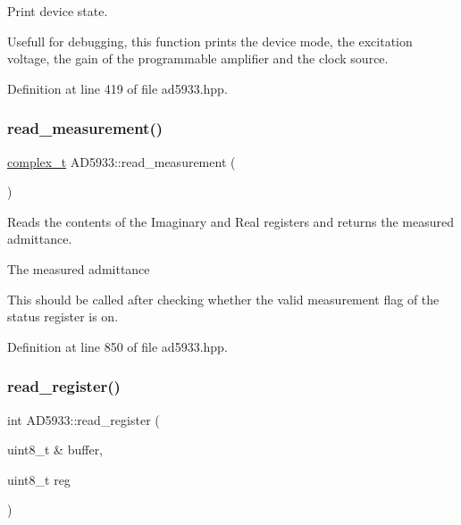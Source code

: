 Print device state. 

Usefull for debugging, this function prints the device mode, the excitation voltage, the gain of the programmable amplifier and the clock source. 

Definition at line 419 of file ad5933.\+hpp.

\mbox{\label{struct_a_d5933_ad1d4ef0943cb72ab1574054d5efe5842}} 
\subsubsection{\texorpdfstring{read\+\_\+measurement()}{read\_measurement()}}
{\footnotesize\ttfamily \mbox{\hyperlink{ad5933_8hpp_ae1cf790e72cff992603d30d0abba52f3}{complex\+\_\+t}} A\+D5933\+::read\+\_\+measurement (\begin{DoxyParamCaption}{ }\end{DoxyParamCaption})}

Reads the contents of the Imaginary and Real registers and returns the measured admittance. ~\newline
\begin{DoxyVerb}\return The measured admittance 
\end{DoxyVerb}


This should be called after checking whether the valid measurement flag of the status register is on. 

Definition at line 850 of file ad5933.\+hpp.

\mbox{\label{struct_a_d5933_a3fb37885bc122590a2e7d948d17889e0}} 
\subsubsection{\texorpdfstring{read\+\_\+register()}{read\_register()}}
{\footnotesize\ttfamily int A\+D5933\+::read\+\_\+register (\begin{DoxyParamCaption}\item[{uint8\+\_\+t \&}]{buffer,  }\item[{uint8\+\_\+t}]{reg }\end{DoxyParamCaption})}



